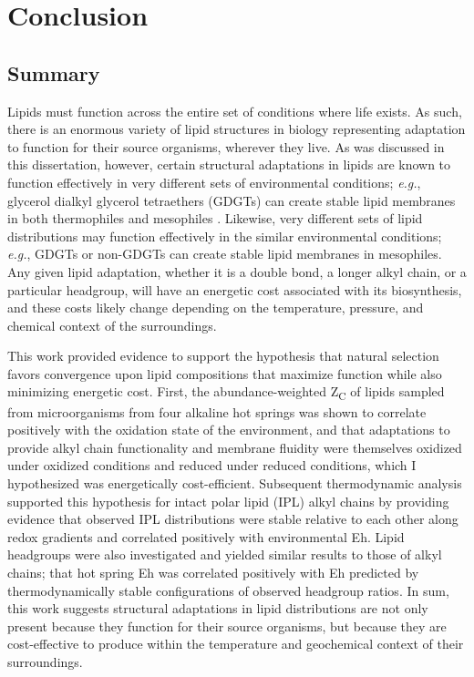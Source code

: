 \chapter[CONCLUSION]{Conclusion}

\section{Summary}

Lipids must function across the entire set of conditions where life exists. As such, there is an enormous variety of lipid structures in biology representing adaptation to function for their source organisms, wherever they live. As was discussed in this dissertation, however, certain structural adaptations in lipids are known to function effectively in very different sets of environmental conditions; \textit{e.g.}, glycerol dialkyl glycerol tetraethers (GDGTs) can create stable lipid membranes in both thermophiles and mesophiles \citep{schouten2000widespread}. Likewise, very different sets of lipid distributions may function effectively in the similar environmental conditions; \textit{e.g.}, GDGTs or non-GDGTs can create stable lipid membranes in mesophiles. Any given lipid adaptation, whether it is a double bond, a longer alkyl chain, or a particular headgroup, will have an energetic cost associated with its biosynthesis, and these costs likely change depending on the temperature, pressure, and chemical context of the surroundings.

This work provided evidence to support the hypothesis that natural selection favors convergence upon lipid compositions that maximize function while also minimizing energetic cost. First, the abundance-weighted Z\textsubscript{C} of lipids sampled from microorganisms from four alkaline hot springs was shown to correlate positively with the oxidation state of the environment, and that adaptations to provide alkyl chain functionality and membrane fluidity were themselves oxidized under oxidized conditions and reduced under reduced conditions, which I hypothesized was energetically cost-efficient. Subsequent thermodynamic analysis supported this hypothesis for intact polar lipid (IPL) alkyl chains by providing evidence that observed IPL distributions were stable relative to each other along redox gradients and correlated positively with environmental Eh. Lipid headgroups were also investigated and yielded similar results to those of alkyl chains; that hot spring Eh was correlated positively with Eh predicted by thermodynamically stable configurations of observed headgroup ratios. In sum, this work suggests structural adaptations in lipid distributions are not only present because they function for their source organisms, but because they are cost-effective to produce within the temperature and geochemical context of their surroundings.

